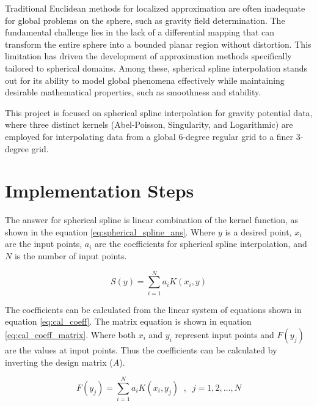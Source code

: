 \documentclass[12pt]{article}
\begin{document}
	Traditional Euclidean methods for localized approximation are often inadequate for global problems on the sphere, such as gravity field determination. The fundamental challenge lies in the lack of a differential mapping that can transform the entire sphere into a bounded planar region without distortion. This limitation has driven the development of approximation methods specifically tailored to spherical domains. Among these, spherical spline interpolation stands out for its ability to model global phenomena effectively while maintaining desirable mathematical properties, such as smoothness and stability.
	
	This project is focused on spherical spline interpolation for gravity potential data, where three distinct kernels (Abel-Poisson, Singularity, and Logarithmic) are employed for interpolating data from a global 6-degree regular grid to a finer 3-degree grid.
		
	\section{Implementation Steps}
	
	The answer for spherical spline is linear combination of the kernel function, as shown in the equation \ref{eq:spherical_spline_ans}. Where $y$ is a desired point, $x_i$ are the input points, $a_i$ are the coefficients for spherical spline interpolation, and $N$ is the number of input points.
	
	\begin{equation}
		S(y) = \sum_{i=1}^{N}a_iK(x_i,y)
		\label{eq:spherical_spline_ans}
	\end{equation}
	
	The coefficients can be calculated from the linear system of equations shown in equation \ref{eq:cal_coeff}. The matrix equation is shown in equation \ref{eq:cal_coeff_matrix}. Where both $x_i$ and $y_i$ represent input points and $F(y_j)$ are the values at input points. Thus the coefficients can be calculated by inverting the design matrix ($A$).
	
	\begin{equation}
		F(y_j) = \sum_{i=1}^{N}a_iK(x_i,y_j) \;\;,\;\; j=1,2,\dots,N
		\label{eq:cal_coeff}
	\end{equation}
	
\end{document}
